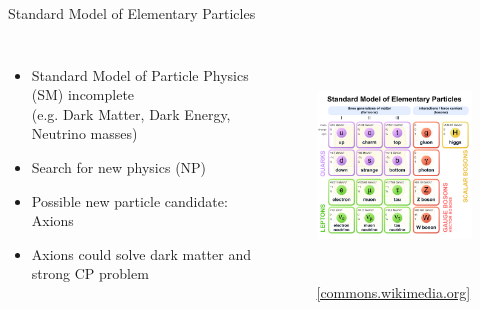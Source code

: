 \documentclass[aspectratio=1610, 9pt]{beamer}
\begin{document}
\begin{frame}{Standard Model of Elementary Particles}
  \begin{columns}
    \centering
    \begin{itemize}
      \item Standard Model of Particle Physics (SM) incomplete \\ (e.g. Dark Matter, Dark Energy, Neutrino masses)
      \item Search for new physics (NP)
      \item Possible new particle candidate: Axions
      \item Axions could solve dark matter and strong CP problem
    \end{itemize}
    \begin{figure}
    \includegraphics[height=6cm]{images/SM.pdf}
    \caption{\footnotesize \href{https://commons.wikimedia.org/wiki/File:Standard_Model_of_Elementary_Particles.svg}{{[commons.wikimedia.org]}}}
    \end{figure}
  \end{columns} 
\end{frame}
\end{document}

